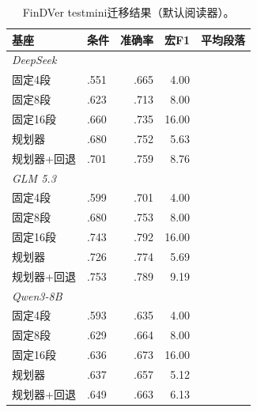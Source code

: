 \begin{table}[htbp]
\centering
{}
\setlength{\tabcolsep}{3pt}
\caption{FinDVer testmini迁移结果（默认阅读器）。}
\label{tab:findver}
\begin{tabular}{llrrr}
\toprule
基座 & 条件 & 准确率 & 宏F1 & 平均段落 \\
\midrule
\multicolumn{5}{l}{\textit{DeepSeek}} \\
固定4段 & .551 & .665 & 4.00 \\
固定8段 & .623 & .713 & 8.00 \\
固定16段 & .660 & .735 & 16.00 \\
规划器 & .680 & .752 & 5.63 \\
规划器+回退 & .701 & .759 & 8.76 \\
\midrule
\multicolumn{5}{l}{\textit{GLM 5.3}} \\
固定4段 & .599 & .701 & 4.00 \\
固定8段 & .680 & .753 & 8.00 \\
固定16段 & .743 & .792 & 16.00 \\
规划器 & .726 & .774 & 5.69 \\
规划器+回退 & .753 & .789 & 9.19 \\
\midrule
\multicolumn{5}{l}{\textit{Qwen3-8B}} \\
固定4段 & .593 & .635 & 4.00 \\
固定8段 & .629 & .664 & 8.00 \\
固定16段 & .636 & .673 & 16.00 \\
规划器 & .637 & .657 & 5.12 \\
规划器+回退 & .649 & .663 & 6.13 \\
\bottomrule
\end{tabular}
\end{table}

